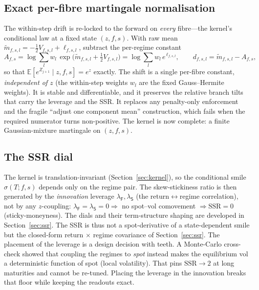 \documentclass[11pt]{article}
\newcommand{\E}{\mathbb{E}}
\newcommand{\SSR}{\mathrm{SSR}}
\begin{document}
\subsection{Exact per-fibre martingale normalisation}
The within-step drift is re-locked to the forward on \emph{every} fibre---the kernel's
conditional law at a fixed state $(z,f,s)$. With raw mean
$\widetilde m_{f,s,l}=-\tfrac12 V_{f,s,l}+\ell_{f,s,l}$, subtract the per-regime constant
\begin{equation}
A_{f,s}=\log\sum_l w_l\,\exp\!\big(\widetilde m_{f,s,l}+\tfrac12 V_{f,s,l}\big)
       =\log\sum_l w_l\,e^{\,\ell_{f,s,l}},\qquad
d_{f,s,l}=\widetilde m_{f,s,l}-A_{f,s},
\label{eq:mg-norm}
\end{equation}
so that $\E[e^{Z_{j+1}}\mid z,f,s]=e^{z}$ exactly. The shift is a single per-fibre
constant, \emph{independent of $z$} (the within-step weights $w_l$ are the fixed
Gauss--Hermite weights). It is stable and differentiable, and it preserves the relative branch
tilts that carry the leverage and the SSR. It replaces any penalty-only enforcement and
the fragile ``adjust one component mean'' construction, which fails when the required
numerator turns non-positive. The kernel is now complete: a finite Gaussian-mixture
martingale on $(z,f,s)$.

\subsection{The SSR dial}
\label{sec:ssrdial}
The kernel is translation-invariant (Section~\ref{sec:kernel}), so the
conditional smile $\sigma(T;f,s)$ depends only on the regime pair. The skew-stickiness ratio is
then generated by the \emph{innovation} leverage
$\lambda_{\mathsf{F}},\lambda_{\mathsf{S}}$ (the return$\leftrightarrow$regime correlation), not by any
$z$-coupling: $\lambda_{\mathsf{F}}=\lambda_{\mathsf{S}}=0\Rightarrow$ no spot--vol comovement
$\Rightarrow\SSR=0$ (sticky-moneyness). The dials and their term-structure shaping are
developed in Section~\ref{sec:ssr}. The SSR is
thus not a spot-derivative of a state-dependent smile but the closed-form
return$\,\times\,$regime covariance of Section~\ref{sec:ssr}. The placement of the leverage is
a design decision with teeth. A Monte-Carlo cross-check showed that coupling the regimes to
\emph{spot} instead makes the equilibrium vol a deterministic function of spot (local
volatility). That pins $\SSR\to2$ at long maturities and cannot be re-tuned. Placing the
leverage in the innovation breaks that floor while keeping the readouts exact.
\end{document}

